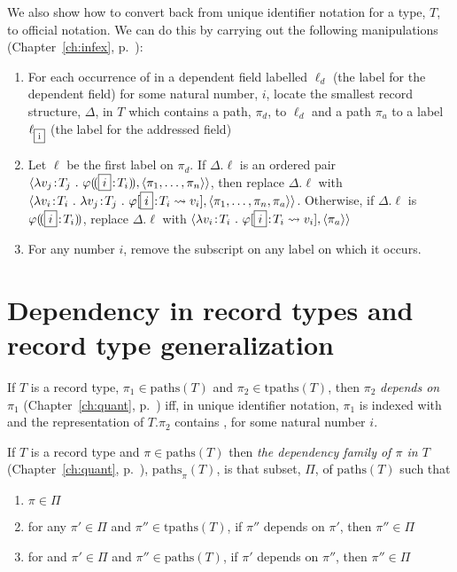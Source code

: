 We also show how to convert back from unique identifier
notation for a type, $T$, to official notation.   We can do this by
carrying out the following manipulations (Chapter~\ref{ch:infex},
p.~\pageref{ex:unique-id-to-official}):
\begin{enumerate} 
 
\item For each occurrence of  in a dependent field labelled
  $\ell_d$ (the label for the dependent field) for some
  natural number, $i$, locate the smallest record structure, $\Delta$, in $T$
  which contains a path, $\pi_d$, to $\ell_d$ and a path $\pi_a$ to a
  label $\ell_{\text{\fbox{i}}}$ (the label for the addressed field)
 
\item Let $\ell$ be the first label on $\pi_d$. If $\Delta.\ell$ is an
  ordered pair $\langle \lambda v_j\!:\!T_j\ .\ \varphi(\!(\text{\fbox{$i$}}\!:\!T_i)\!),
  \langle\pi_1,\ldots,\pi_n\rangle\rangle$, then replace $\Delta.\ell$
  with $\langle \lambda v_i\!:\!T_i\ .\ \lambda v_j\!:\!T_j\ .\
  \varphi[\text{\fbox{$i$}}\!:\!T_i\leadsto v_i],
  \langle\pi_1,\ldots,\pi_n,\pi_a\rangle\rangle$.  Otherwise, if
  $\Delta.\ell$ is $\varphi(\!(\text{\fbox{$i$}}\!:\!T_i)\!)$, replace
  $\Delta.\ell$ with $\langle \lambda v_i\!:\!T_i\ .\
  \varphi[\text{\fbox{$i$}}\!:\!T_i\leadsto v_i],
  \langle\pi_a\rangle\rangle$

\item For any number $i$, remove the subscript  on any label
  on which it occurs.
 
\end{enumerate}

\section{Dependency in record types and record type generalization}
\label{app:dep-rectype}

If $T$ is a record type, $\pi_1\in\mathrm{paths}(T)$ and
$\pi_2\in\mathrm{tpaths}(T)$, then $\pi_2$ \textit{depends on} $\pi_1$
(Chapter~\ref{ch:quant}, p.~\pageref{ex:path-dep})
iff, in unique identifier notation, $\pi_1$ is indexed with 
and the representation of $T.\pi_2$ contains \fbox{$i$}, for some
natural number $i$.

If $T$ is a record type and $\pi\in\mathrm{paths}(T)$ then \textit{the
  dependency family of $\pi$ in $T$} (Chapter~\ref{ch:quant}, p.~\pageref{ex:path-dep-fam}),
$\mathrm{paths}_\pi(T)$, is that subset, $\Pi$, of $\mathrm{paths}(T)$
such that
\begin{enumerate} 
 
\item $\pi\in\Pi$ 
 
\item for any $\pi'\in\Pi$ and $\pi''\in\mathrm{tpaths}(T)$, if
  $\pi''$ depends on $\pi'$, then $\pi''\in\Pi$

\item for and $\pi'\in\Pi$ and $\pi''\in\mathrm{paths}(T)$, if $\pi'$
  depends on $\pi''$, then $\pi''\in\Pi$
 
\end{enumerate}

